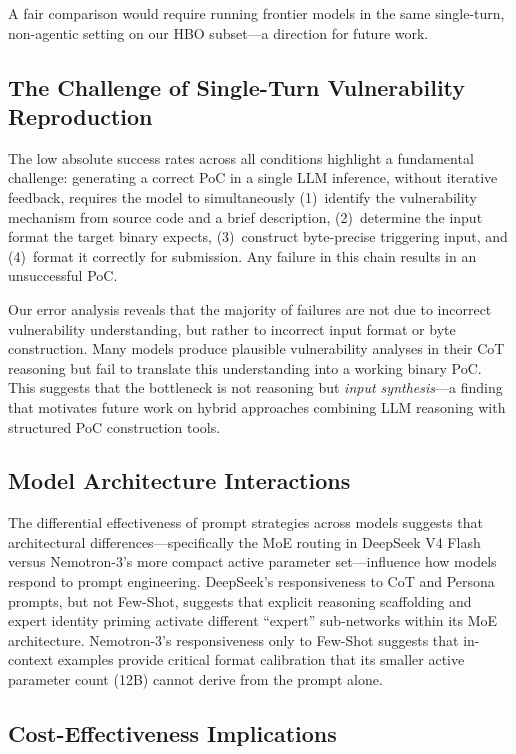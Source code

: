 \documentclass{ieeeaccess}
\begin{document}
A fair comparison would require running frontier models in the same single-turn, non-agentic setting on our HBO subset---a direction for future work.

\subsection{The Challenge of Single-Turn Vulnerability Reproduction}

The low absolute success rates across all conditions highlight a fundamental challenge: generating a correct PoC in a single LLM inference, without iterative feedback, requires the model to simultaneously (1)~identify the vulnerability mechanism from source code and a brief description, (2)~determine the input format the target binary expects, (3)~construct byte-precise triggering input, and (4)~format it correctly for submission. Any failure in this chain results in an unsuccessful PoC.

Our error analysis reveals that the majority of failures are not due to incorrect vulnerability understanding, but rather to incorrect input format or byte construction. Many models produce plausible vulnerability analyses in their CoT reasoning but fail to translate this understanding into a working binary PoC. This suggests that the bottleneck is not reasoning but \emph{input synthesis}---a finding that motivates future work on hybrid approaches combining LLM reasoning with structured PoC construction tools.

\subsection{Model Architecture Interactions}

The differential effectiveness of prompt strategies across models suggests that architectural differences---specifically the MoE routing in DeepSeek V4 Flash versus Nemotron-3's more compact active parameter set---influence how models respond to prompt engineering. DeepSeek's responsiveness to CoT and Persona prompts, but not Few-Shot, suggests that explicit reasoning scaffolding and expert identity priming activate different ``expert'' sub-networks within its MoE architecture. Nemotron-3's responsiveness only to Few-Shot suggests that in-context examples provide critical format calibration that its smaller active parameter count (12B) cannot derive from the prompt alone.

\subsection{Cost-Effectiveness Implications}
\end{document}
